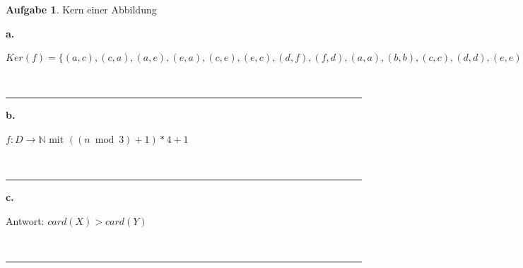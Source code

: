 \documentclass[10pt,leqno ]{article}
\theoremstyle{definition}
\newtheorem{problem}[theorem]{Aufgabe}
\newenvironment{solution}[1][L]{\begin{doublespace}\textbf{#1.}\quad }{\ \rule{0.5em}{0.5em}\end{doublespace}}
\begin{document}
\begin{problem}
    Kern einer Abbildung
\end{problem}
\begin{solution}[a]
    
\( Ker(f) = \{ (a,c), (c,a), (a,e), (e,a), (c,e), (e,c), (d,f), (f,d), (a,a), (b,b), (c,c), (d,d), (e,e) \} \)

\end{solution}

\begin{solution}[b]

    \( f:D \rightarrow \mathbb{N} \) mit \( ((n \bmod 3) + 1) * 4 + 1 \)

\end{solution}

\begin{solution}[c]

    Antwort: \( card(X) > card(Y) \)
    
\end{solution}
\end{document}
